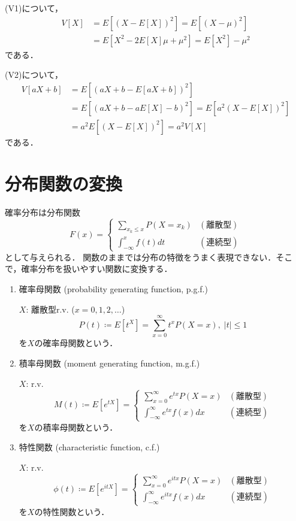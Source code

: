 \documentclass{jsreport}
\begin{document}
(V1)について，
\begin{align}
  V[X] &= E[(X-E[X])^2] = E[(X - \mu)^2] \nonumber \\
  &= E[X^2 - 2E[X]\mu + \mu^2] = E[X^2] - \mu^2 \nonumber
\end{align}
である．

(V2)について，
\begin{align}
  V[aX + b] &= E[(aX + b - E[aX + b])^2] \nonumber \\
  &= E[(aX + b - aE[X] -b)^2] = E[a^2(X - E[X])^2] \nonumber \\
  &= a^2 E[(X - E[X])^2] = a^2 V[X] \nonumber
\end{align}
である．

\section{分布関数の変換}
確率分布は分布関数
\begin{equation}
  F(x) = \begin{cases}
    \sum_{x_k \leq x} P(X = x_k) & (離散型) \\
    \int_{-\infty}^x f(t)dt & (連続型)
\end{cases}\nonumber
\end{equation}
として与えられる．
関数のままでは分布の特徴をうまく表現できない．そこで，確率分布を扱いやすい関数に変換する．

\begin{enumerate}
  \item 確率母関数 (probability generating function, p.g.f.)

  $X$: 離散型r.v. ($x = 0, 1, 2, \ldots$)
  \begin{equation}
    P(t) \coloneqq E[t^X] = \sum_{x = 0}^{\infty} t^x P(X = x), \; |t| \leq 1 \nonumber
  \end{equation}
  を$X$の確率母関数という．
  \item 積率母関数 (moment generating function, m.g.f.)

  $X$: r.v.
  \begin{equation}
    M(t) \coloneqq E[e^{tX}] = \begin{cases}
      \sum_{x = 0}^{\infty} e^{tx} P(X = x) & (離散型) \\
      \int_{-\infty}^{\infty} e^{tx} f(x) dx & (連続型)
  \end{cases} \nonumber
  \end{equation}
  を$X$の積率母関数という．
  \item 特性関数 (characteristic function, c.f.)

  $X$: r.v.
  \begin{equation}
    \phi(t) \coloneqq E[e^{itX}] = \begin{cases}
      \sum_{x = 0}^{\infty} e^{itx} P(X = x) & (離散型) \\
      \int_{-\infty}^{\infty} e^{itx} f(x) dx & (連続型)
  \end{cases} \nonumber
  \end{equation}
  を$X$の特性関数という．
\end{enumerate}
\end{document}

